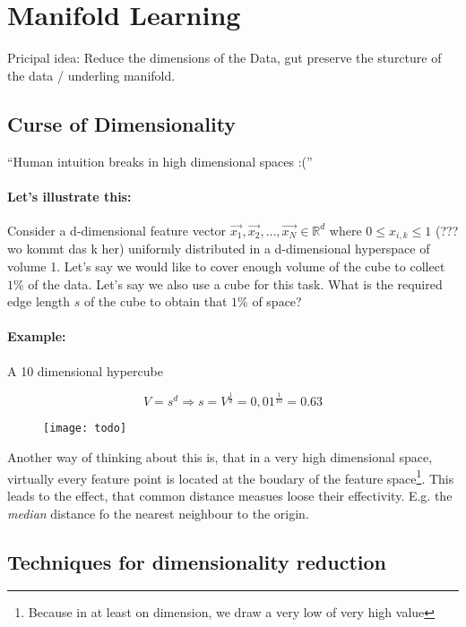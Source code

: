 
\section*{Manifold Learning}
Pricipal idea: Reduce the dimensions of the Data, gut preserve the sturcture of the data / underling manifold.

\subsection*{Curse of Dimensionality}
``Human intuition breaks in high dimensional spaces :(''

\paragraph{Let's illustrate this:}
Consider a d-dimensional feature vector $\vec{x_1}, \vec{x_2}, \dots, \vec{x_N} \in \mathbb{R}^d$ where $0 \le x_{i,k} \le 1$ (??? wo kommt das k her) uniformly distributed in a d-dimensional hyperspace of volume 1.
Let's say we would like to cover enough volume of  the cube to collect $1\%$ of the data. Let's say we also use a cube for this task. What is the required edge length $s$ of the cube to obtain that $1\%$ of space?

\paragraph{Example:}
A 10 dimensional hypercube

\begin{equation*}
    V=s^d \Rightarrow s = V^{\frac{1}{d}} = 0,01^{\frac{1}{10}} = 0.63
\end{equation*}

\begin{figure}[H]
	\centering
	\texttt{[image: todo]}
\end{figure}

Another way of thinking about this is, that in a very high dimensional space, virtually every feature point is located at the boudary of the feature space\footnote{Because in at least on dimension, we draw a very low of very high value}. This leads to the effect, that common distance measues loose their  effectivity. E.g. the \textit{median} distance fo the nearest neighbour to the origin.

\subsection*{Techniques for dimensionality reduction}


